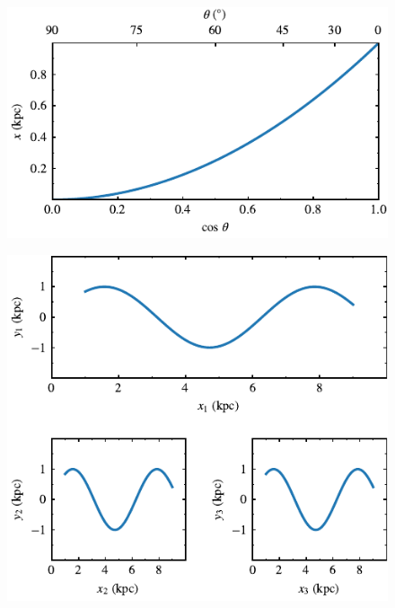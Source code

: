 \documentclass[usenatbib]{mnras}
\begin{document}
\lipsum[1-3]

\begin{figure}
\includegraphics{../pdf/009.pdf}
\caption[]{\lipsum[66]}
\label{fig009}
\end{figure}

\lipsum[1-3]

\begin{figure}
\includegraphics{../pdf/010.pdf}
\caption[]{\lipsum[66]}
\label{fig010}
\end{figure}

\lipsum[1-3]
\end{document}
